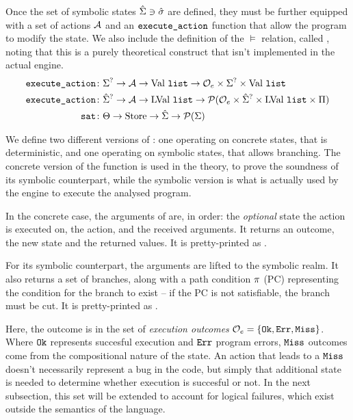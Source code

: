 Once the set of symbolic states $\hat{\Sigma}\ni\hat{\sigma}$ are defined, they must be further equipped with a set of actions ${\cal{A}}$ and an $\texttt{execute\_action}$ function that allow the program to modify the state. We also include the definition of the $\models$ relation, called , noting that this is a purely theoretical construct that isn't implemented in the actual engine.
\begin{align*}
	\texttt{execute\_action} &\colon \Sigma^? \rightarrow {\ensuremath{\cal{A}}} \rightarrow \text{Val}~\texttt{list} \rightarrow {\cal O}_e \times \Sigma^? \times \text{Val}~\texttt{list}\\
	\texttt{execute\_action} &\colon \hat{\Sigma}^? \rightarrow {\ensuremath{\cal{A}}} \rightarrow \text{LVal}~\texttt{list} \rightarrow {\cal P}({\cal O}_e \times \hat{\Sigma}^? \times \text{LVal}~\texttt{list} \times \Pi) \\
	\texttt{sat} &\colon \Theta \rightarrow \text{Store} \rightarrow \hat{\Sigma} \rightarrow {\cal P}(\Sigma)
\end{align*}

We define two different versions of \execac{}: one operating on concrete states, that is deterministic, and one operating on symbolic states, that allows branching. The concrete version of the function is used in the theory, to prove the soundness of its symbolic counterpart, while the symbolic version is what is actually used by the engine to execute the analysed program.

In the concrete case, the arguments of \execac{} are, in order: the \emph{optional} state the action is executed on, the action, and the received arguments. It returns an outcome, the new state and the returned values. It is pretty-printed as .

For its symbolic counterpart, the arguments are lifted to the symbolic realm. It also returns a set of branches, along with a path condition $\pi$ (PC) representing the condition for the branch to exist -- if the PC is not satisfiable, the branch must be cut. It is pretty-printed as .

Here, the outcome is in the set of \emph{execution outcomes} ${\cal O}_e=\{ \texttt{Ok},\texttt{Err},\texttt{Miss} \}$. Where $\texttt{Ok}$ represents succesful execution and $\texttt{Err}$ program errors, $\texttt{Miss}$ outcomes come from the compositional nature of the state. An action that leads to a $\texttt{Miss}$ doesn't necessarily represent a bug in the code, but simply that additional state is needed to determine whether execution is succesful or not. In the next subsection, this set will be extended to account for logical failures, which exist outside the semantics of the language.

